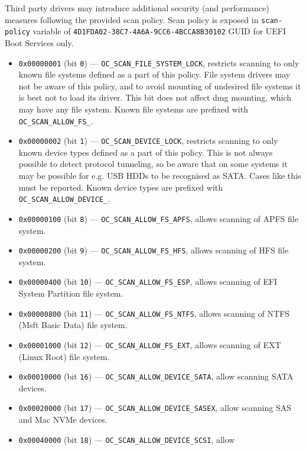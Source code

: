 \documentclass[]{article}
\providecommand{\tightlist}{%
  \setlength{\itemsep}{0pt}\setlength{\parskip}{0pt}}
\begin{document}
\begin{enumerate}
  Third party drivers may introduce additional security (and performance)
  measures following the provided scan policy. Scan policy is exposed
  in \texttt{scan-policy} variable of \texttt{4D1FDA02-38C7-4A6A-9CC6-4BCCA8B30102}
  GUID for UEFI Boot Services only.

  \begin{itemize}
  \tightlist
    \item \texttt{0x00000001} (bit \texttt{0}) --- \texttt{OC\_SCAN\_FILE\_SYSTEM\_LOCK}, restricts
    scanning to only known file systems defined as a part of this policy. File system
    drivers may not be aware of this policy, and to avoid mounting of undesired file
    systems it is best not to load its driver. This bit does not affect dmg mounting,
    which may have any file system. Known file systems are prefixed with
    \texttt{OC\_SCAN\_ALLOW\_FS\_}.
    \item \texttt{0x00000002} (bit \texttt{1}) --- \texttt{OC\_SCAN\_DEVICE\_LOCK}, restricts scanning
    to only known device types defined as a part of this policy. This is not always possible
    to detect protocol tunneling, so be aware that on some systems it may be possible for
    e.g. USB HDDs to be recognised as SATA. Cases like this must be reported. Known device
    types are prefixed with \texttt{OC\_SCAN\_ALLOW\_DEVICE\_}.
    \item \texttt{0x00000100} (bit \texttt{8}) --- \texttt{OC\_SCAN\_ALLOW\_FS\_APFS}, allows scanning
    of APFS file system.
    \item \texttt{0x00000200} (bit \texttt{9}) --- \texttt{OC\_SCAN\_ALLOW\_FS\_HFS}, allows scanning
    of HFS file system.
    \item \texttt{0x00000400} (bit \texttt{10}) --- \texttt{OC\_SCAN\_ALLOW\_FS\_ESP}, allows scanning
    of EFI System Partition file system.
    \item \texttt{0x00000800} (bit \texttt{11}) --- \texttt{OC\_SCAN\_ALLOW\_FS\_NTFS}, allows scanning
    of NTFS (Msft Basic Data) file system.
    \item \texttt{0x00001000} (bit \texttt{12}) --- \texttt{OC\_SCAN\_ALLOW\_FS\_EXT}, allows scanning
    of EXT (Linux Root) file system.
    \item \texttt{0x00010000} (bit \texttt{16}) --- \texttt{OC\_SCAN\_ALLOW\_DEVICE\_SATA}, allow
    scanning SATA devices.
    \item \texttt{0x00020000} (bit \texttt{17}) --- \texttt{OC\_SCAN\_ALLOW\_DEVICE\_SASEX}, allow
    scanning SAS and Mac NVMe devices.
    \item \texttt{0x00040000} (bit \texttt{18}) --- \texttt{OC\_SCAN\_ALLOW\_DEVICE\_SCSI}, allow

\end{itemize}
\end{enumerate}
\end{document}
